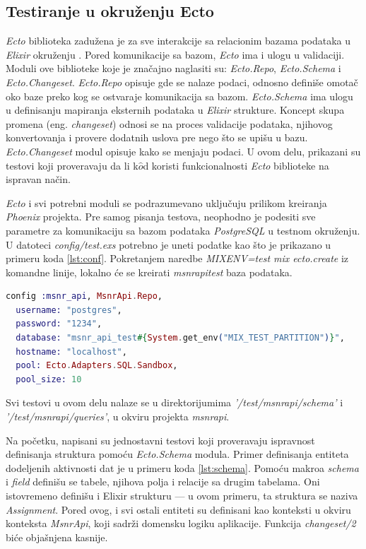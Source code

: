 \documentclass[12pt,oneside]{memoir}
\begin{document}
\subsection{Testiranje u okruženju Ecto}
\par \emph{Ecto} biblioteka zadužena je za sve interakcije sa relacionim bazama podataka u \emph{Elixir} okruženju \cite{ecto}. Pored komunikacije sa bazom, \emph{Ecto} ima i ulogu u validaciji. Moduli ove biblioteke koje je značajno naglasiti su: \emph{Ecto.Repo}, \emph{Ecto.Schema} i \emph{Ecto.Changeset}. \emph{Ecto.Repo} opisuje gde se nalaze podaci, odnosno definiše omotač oko baze preko kog se ostvaraje komunikacija sa bazom. \emph{Ecto.Schema} ima ulogu u definisanju mapiranja eksternih podataka u \emph{Elixir} strukture. Koncept skupa promena (eng. \emph{changeset}) odnosi se na proces validacije podataka, njihovog konvertovanja i provere dodatnih uslova pre nego što se upišu u bazu. \emph{Ecto.Changeset} modul opisuje kako se menjaju podaci. U ovom delu, prikazani su testovi koji proveravaju da li k$\hat{o}$d koristi funkcionalnosti \emph{Ecto} biblioteke na ispravan način.
\par \emph{Ecto} i svi potrebni moduli se podrazumevano uključuju prilikom kreiranja \emph{Phoenix} projekta. Pre samog pisanja testova, neophodno je podesiti sve parametre za komunikaciju sa bazom podataka \emph{PostgreSQL} u testnom okruženju. U datoteci \emph{config/test.exs} potrebno je uneti podatke kao što je prikazano u primeru koda \ref{lst:conf}. Pokretanjem naredbe \emph{MIX{\textunderscore}ENV=test mix ecto.create} iz komandne linije, lokalno će se kreirati \emph{msnr{\textunderscore}api{\textunderscore}test} baza podataka.

\begin{lstlisting}[language=elixir, caption={Konfiguracija baze podataka u testnom okruženju},captionpos=b, label={lst:conf}]
  config :msnr_api, MsnrApi.Repo,
  username: "postgres",
  password: "1234",
  database: "msnr_api_test#{System.get_env("MIX_TEST_PARTITION")}",
  hostname: "localhost",
  pool: Ecto.Adapters.SQL.Sandbox,
  pool_size: 10
\end{lstlisting}

\par Svi testovi u ovom delu nalaze se u direktorijumima \textit{'/test/msnr{\textunderscore}api/schema'} i \textit{'/test/msnr{\textunderscore}api/queries'}, u okviru projekta \emph{msnr{\textunderscore}api}. 
\par Na početku, napisani su jednostavni testovi koji proveravaju ispravnost definisanja struktura pomoću \emph{Ecto.Schema} modula. Primer definisanja entiteta dodeljenih aktivnosti  dat je u primeru koda \ref{lst:schema}. Pomoću makroa \emph{schema} i \emph{field} definišu se tabele, njihova polja i relacije sa drugim tabelama. Oni istovremeno definišu i Elixir strukturu --- u ovom primeru, ta struktura se naziva \emph{Assignment}. Pored ovog, i svi ostali entiteti su definisani kao konteksti u okviru konteksta \emph{MsnrApi}, koji sadrži domensku logiku aplikacije. Funkcija \emph{changeset/2} biće objašnjena kasnije.
\end{document}
